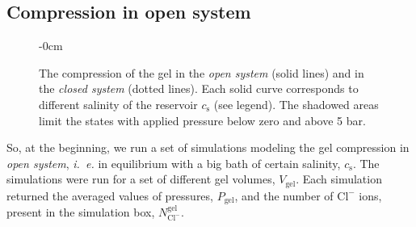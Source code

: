 \documentclass[journal,article,submit,pdftex,moreauthors]{Definitions/mdpi}
\newcommand{\ie}{\textit{i.~e.} }
\newcommand{\Ncl}{N_\mathrm{Cl^-}}
\newcommand{\gel}{^\mathrm{gel}}
\newcommand{\cl}{\mathrm{Cl^-}}
\newcommand{\cs}{c_{\mathrm{s}}}
\newcommand{\Vgel}{V_\mathrm{gel}}
\begin{document}
\subsection{Compression in open system}
\begin{figure}[h]
	\begin{adjustwidth}{-\extralength}{0cm}
	\hspace{0.02\textwidth}
	\caption{
	The compression of the gel in the \emph{open system} (solid lines) and in the \emph{closed system} (dotted lines). 
	Each solid curve corresponds to different salinity of the reservoir $\cs$ (see legend).
	The shadowed areas limit the states with applied pressure below zero and above 5 bar.\label{fig: PV and CV}}
	\end{adjustwidth}
\end{figure}
So, at the beginning, we run a set of simulations modeling the gel compression in \emph{open system}, \ie in equilibrium with a big bath of certain salinity, $\cs$. 
The simulations were run for a set of different gel volumes, $\Vgel$. 
Each simulation returned the averaged values of pressures, $P_\mathrm{gel}$, and the number of $\cl$ ions, present in the simulation box, $\Ncl\gel$. 
\end{document}
